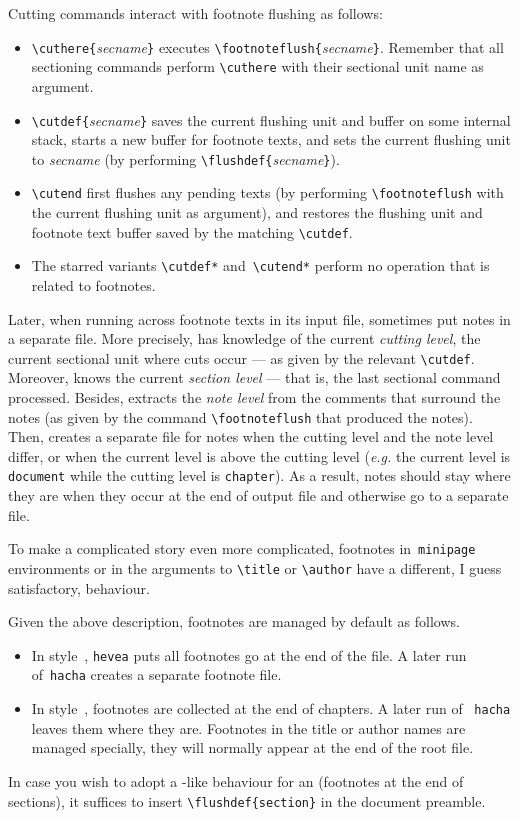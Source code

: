 Cutting commands interact with footnote flushing as follows:
\begin{itemize}
\item \verb+\cuthere{+\textit{secname}\verb+}+
executes \verb+\footnoteflush{+\textit{secname}\verb+}+.
Remember that all sectioning commands perform
\verb+\cuthere+ with their sectional unit name as argument.
\item \verb+\cutdef{+\textit{secname}\verb+}+
saves the current flushing unit and  buffer on some internal stack,
starts a new buffer for footnote texts, and
sets the current flushing unit to \textit{secname}
(by performing \verb+\flushdef{+\textit{secname}\verb+}+).
\item \verb+\cutend+ first flushes any pending texts
(by performing \verb+\footnoteflush+ with the current flushing unit
as argument), and restores the flushing unit and footnote text buffer saved
by the matching \verb+\cutdef+.
\item The starred variants \verb+\cutdef*+ and~\verb+\cutend*+ perform
no operation that is related to footnotes.
\end{itemize}

Later, when running across footnote texts in its input file, \hacha{}
sometimes put notes in a separate file.
More precisely, \hacha{} has knowledge of the
current \emph{cutting level}, the current sectional unit where
cuts occur --- as given by the relevant \verb+\cutdef+.
Moreover, \hacha{} knows the current \emph{section level} ---
that is, the last sectional command processed.
Besides, \hacha{} extracts the \emph{note level} from the comments
that surround the notes (as given by the command
\verb+\footnoteflush+ that produced the notes).
Then, \hacha{} creates a separate file for notes
when the cutting level and the note level differ,
or when the current level is above the cutting level
(\emph{e.g.} the current level is \texttt{document} while the cutting
level is \texttt{chapter}).
As a result, notes should stay where they are when they occur at the end of
\hacha{} output file and otherwise go to a separate file.

To make a complicated story even more complicated,
footnotes in~\texttt{minipage} environments or in the arguments
to \verb+\title+ or \verb+\author+ have a different, I guess satisfactory,
behaviour.

Given the above description, footnotes are managed by default as follows.
\begin{itemize}
\item In style~, \texttt{hevea} puts all footnotes
go at the end of the \html{} file.
A later run of~\texttt{hacha} creates a separate footnote file.
\item In style~, footnotes are collected at the end of
chapters. A later run of ~\texttt{hacha} leaves them where they
are. Footnotes in the title or author names are managed specially,
they will normally appear at the end of the root file.
\end{itemize}
%
In case you wish to adopt a -like behaviour for
an  (footnotes at the end of sections),
it suffices to insert \verb+\flushdef{section}+ in the document
preamble.


